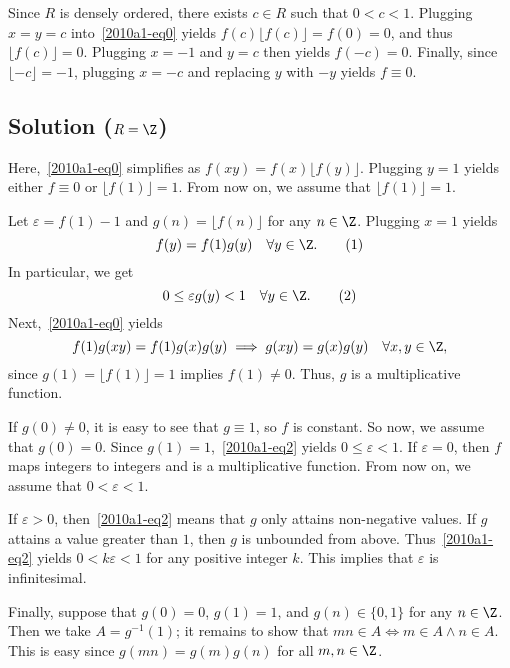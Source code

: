 Since $R$ is densely ordered, there exists $c \in R$ such that $0 < c < 1$.
Plugging $x = y = c$ into~\eqref{2010a1-eq0} yields $f(c) \lfloor f(c) \rfloor = f(0) = 0$, and thus $\lfloor f(c) \rfloor = 0$.
Plugging $x = -1$ and $y = c$ then yields $f(-c) = 0$.
Finally, since $\lfloor -c \rfloor = -1$, plugging $x = -c$ and replacing $y$ with $-y$ yields $f \equiv 0$.





\subsection*{Solution ($R = \Z$)}

Here,~\eqref{2010a1-eq0} simplifies as $f(xy) = f(x) \lfloor f(y) \rfloor$.
Plugging $y = 1$ yields either $f \equiv 0$ or $\lfloor f(1) \rfloor = 1$.
From now on, we assume that $\lfloor f(1) \rfloor = 1$.

Let $\varepsilon = f(1) - 1$ and $g(n) = \lfloor f(n) \rfloor$ for any $n \in \Z$.
Plugging $x = 1$ yields
\[ f(y) = f(1) g(y) \quad \forall y \in \Z. \tag{1}\label{2010a1-eq1} \]
In particular, we get
\[ 0 \leq \varepsilon g(y) < 1 \quad \forall y \in \Z. \tag{2}\label{2010a1-eq2} \]
Next,~\eqref{2010a1-eq0} yields
\[ f(1) g(xy) = f(1) g(x) g(y) \implies g(xy) = g(x) g(y) \quad \forall x, y \in \Z, \]
    since $g(1) = \lfloor f(1) \rfloor = 1$ implies $f(1) \neq 0$.
Thus, $g$ is a multiplicative function.

If $g(0) \neq 0$, it is easy to see that $g \equiv 1$, so $f$ is constant.
So now, we assume that $g(0) = 0$.
Since $g(1) = 1$,~\eqref{2010a1-eq2} yields $0 \leq \varepsilon < 1$.
If $\varepsilon = 0$, then $f$ maps integers to integers and is a multiplicative function.
From now on, we assume that $0 < \varepsilon < 1$.

If $\varepsilon > 0$, then~\eqref{2010a1-eq2} means that $g$ only attains non-negative values.
If $g$ attains a value greater than $1$, then $g$ is unbounded from above.
Thus~\eqref{2010a1-eq2} yields $0 < k \varepsilon < 1$ for any positive integer $k$.
This implies that $\varepsilon$ is infinitesimal.

Finally, suppose that $g(0) = 0$, $g(1) = 1$, and $g(n) \in \{0, 1\}$ for any $n \in \Z$.
Then we take $A = g^{-1}(1)$; it remains to show that $mn \in A \iff m \in A \wedge n \in A$.
This is easy since $g(mn) = g(m) g(n)$ for all $m, n \in \Z$.





